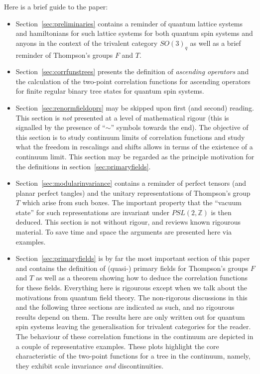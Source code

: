 \documentclass[11pt,oneside]{amsart}
\theoremstyle{plain}%
\theoremstyle{definition}
\theoremstyle{remark}
\begin{document}
Here is a brief guide to the paper:
\begin{itemize}
	\item Section~\ref{sec:preliminaries} contains a reminder of quantum lattice systems and hamiltonians for such lattice systems for both quantum spin systems and anyons in the context of the trivalent category $\mathit{SO}(3)_q$ as well as a brief reminder of Thompson's groups $F$ and $T$.
	\item Section~\ref{sec:corrfunstrees} presents the definition of \emph{ascending operators} and the calculation of the two-point correlation functions for ascending operators for finite regular binary tree states for quantum spin systems.
	\item Section~\ref{sec:renormfieldoprs} may be skipped upon first (and second) reading. This section is \emph{not} presented at a level of mathematical rigour (this is signalled by the presence of ``$\sim$'' symbols towards the end). The objective of this section is to study continuum limits of correlation functions and study what the freedom in rescalings and shifts allows in terms of the existence of a continuum limit. This section may be regarded as the principle motivation for the definitions in section~\ref{sec:primaryfields}.
	\item Section~\ref{sec:modularinvariance} contains a reminder of perfect tensors (and planar perfect tangles) and the unitary representations of Thompson's group $T$ which arise from such boxes. The important property that the ``vacuum state'' for such representations are invariant under $\mathit{PSL}(2,\mathbb{Z})$ is then deduced. This section is not without rigour, and reviews known rigourous material. To save time and space the arguments are presented here via examples.
	\item Section~\ref{sec:primaryfields} is by far the most important section of this paper and contains the definition of (quasi-) primary fields for Thompson's groups $F$ and $T$ as well as a theorem showing how to deduce the correlation functions for these fields. Everything here is rigourous except when we talk about the motivations from quantum field theory. The non-rigorous discussions in this and the following three sections are indicated as such, and no rigourous results depend on them. The results here are only written out for quantum spin systems leaving the generalisation for trivalent categories for the reader. The behaviour of these correlation functions in the continuum are depicted in a couple of representative examples. These plots highlight the core characteristic of the two-point functions for a tree in the continuum, namely, they exhibit scale invariance \emph{and} discontinuities.

\end{itemize}
\end{document}
